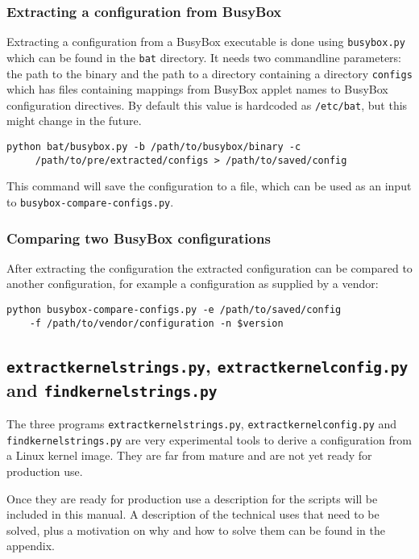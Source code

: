 \documentclass[10pt]{article}
\begin{document}
\subsubsection{Extracting a configuration from BusyBox}

Extracting a configuration from a BusyBox executable is done using
\texttt{busybox.py} which can be found in the \texttt{bat} directory. It needs
two commandline parameters: the path to the binary and the path to a directory
containing a directory \texttt{configs} which has files containing mappings
from BusyBox applet names to BusyBox configuration directives. By default this
value is hardcoded as \texttt{/etc/bat}, but this might change in the future.

\begin{verbatim}
python bat/busybox.py -b /path/to/busybox/binary -c
     /path/to/pre/extracted/configs > /path/to/saved/config
\end{verbatim}

This command will save the configuration to a file, which can be used as an
input to \texttt{busybox-compare-configs.py}.

\subsubsection{Comparing two BusyBox configurations}

After extracting the configuration the extracted configuration can be compared
to another configuration, for example a configuration as supplied by a vendor:

\begin{verbatim}
python busybox-compare-configs.py -e /path/to/saved/config
    -f /path/to/vendor/configuration -n $version
\end{verbatim}

\subsection{\texttt{extractkernelstrings.py}, \texttt{extractkernelconfig.py}
\\and \texttt{findkernelstrings.py}}

The three programs \texttt{extractkernelstrings.py},
\texttt{extractkernelconfig.py} and \texttt{findkernelstrings.py} are very
experimental tools to derive a configuration from a Linux kernel image. They
are far from mature and are not yet ready for production use.

Once they are ready for production use a description for the scripts will be
included in this manual. A description of the technical uses that need to be
solved, plus a motivation on why and how to solve them can be found in the
appendix.
\end{document}
